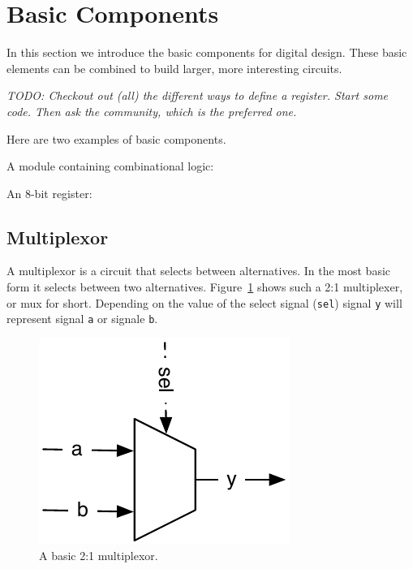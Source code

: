 \documentclass[a4paper]{article}
\newcommand{\code}[1]{{\small{\texttt{#1}}}}
\newcommand{\todo}[1]{{\emph{TODO: #1}}}
\begin{document}
\section{Basic Components}

In this section we introduce the basic components for digital design.
These basic elements can be combined to build larger, more interesting
circuits.

\todo{Checkout out (all) the different ways to define a register.
Start some code.
Then ask the community, which is the preferred one.}




Here are two examples of basic components.

A module containing combinational logic:

%

An 8-bit register:

%

\subsection{Multiplexor}

A multiplexor is a circuit that selects between alternatives. In the most
basic form it selects between two alternatives. Figure~\ref{fig:mux} shows
such a 2:1 multiplexer, or mux for short. Depending on the value of the
select signal (\code{sel}) signal \code{y} will represent signal \code{a} or
signale \code{b}.

\begin{figure}
  \centering
  \includegraphics{figures/mux}

  \caption{A basic 2:1 multiplexor.}
  \label{fig:mux}
\end{figure}
\end{document}
